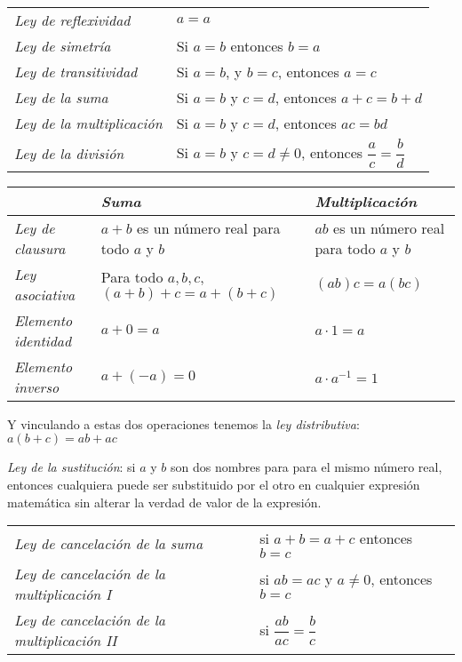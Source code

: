 \begin{center}
    \begin{tabular}{ll}
        \textit{Ley de reflexividad} & $a = a$ \\
        \textit{Ley de simetría} & Si $a = b$ entonces $b = a$ \\
        \textit{Ley de transitividad} &  Si $a = b$, y $b = c$, entonces $a = c$\\
        \textit{Ley de la suma} & Si $a = b$ y $c = d$, entonces $a + c = b + d$ \\
        \textit{Ley de la multiplicación} & Si $a = b$ y $c = d$, entonces $ac = bd$\\
        \textit{Ley de la división} & Si $a = b$ y $c = d \neq 0$, entonces $\dfrac{a}{c} = \dfrac{b}{d}$\\
    \end{tabular}
    \label{tab:ralnumprops1}
\end{center}

\vspace{0.5em}

\begin{center}
    \begin{tabular}{l m{10em} m{10em}}
        & \textit{Suma} & \textit{Multiplicación} \\
        \hline
        \textit{Ley de clausura} & $a + b$ es un número real para todo $a$ y $b$ & $ab$ es un número real para todo $a$ y $b$ \\
        \textit{Ley asociativa} & Para todo $a,b,c$, $(a+b)+c = a+(b+c)$ & $(ab)c = a(bc)$ \\
        \textit{Elemento identidad} & $a + 0 = a$ & $a \cdot 1 = a$ \\
        \textit{Elemento inverso} & $a + (-a) = 0$ & $a \cdot a^{-1} = 1$
    \end{tabular}
    \label{tab:ralnumprops2}
\end{center}

\vspace{0.5em}

Y vinculando a estas dos operaciones tenemos la \textit{ley distributiva}: $a(b +c) = ab + ac$

\textit{Ley de la sustitución}: si $a$ y $b$ son dos nombres para para el mismo número real, entonces cualquiera puede ser substituido por el otro en cualquier expresión matemática sin alterar la verdad de valor de la expresión.

\begin{center}
    \begin{tabular}{ll}
        \textit{Ley de cancelación de la suma} & si $a + b = a + c$ entonces $b = c$ \\
        \textit{Ley de cancelación de la multiplicación I} & si $ab = ac$ y $a \neq 0$, entonces $b = c$ \\
        \textit{Ley de cancelación de la multiplicación II} & si $\dfrac{ab}{ac} = \dfrac{b}{c}$
    \end{tabular}
    \label{tab:ralnumprops1}
\end{center}


\nocite{MGECED05}
\nocite{MGECED06}
\nocite{MGECED07}

\clearpage



\printbibliography[heading=subbibliography,title={Bibliografía}]